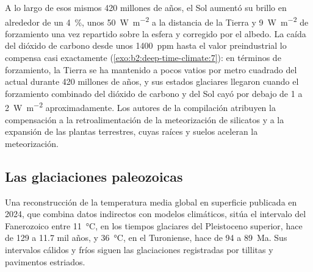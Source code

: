 \begin{omfigure}
\par{}
\end{omfigure}

A lo largo de esos mismos 420 millones de años, el Sol aumentó su brillo en alrededor de un \qty{4}{\percent}, unos
\qty{50}{W.m^{-2}} a la distancia de la Tierra y \qty{9}{W.m^{-2}} de forzamiento una vez repartido sobre la
esfera y corregido por el albedo. La caída del dióxido de carbono desde unos \qty{1400}{ppm} hasta el
valor preindustrial lo compensa casi exactamente (\cref{exo:b2:deep-time-climate:7}): en términos de
forzamiento, la Tierra se ha mantenido a pocos vatios por metro cuadrado del actual durante 420 millones de años,
y sus estados glaciares llegaron cuando el forzamiento combinado del dióxido de carbono y del Sol cayó por debajo de 1
a \qty{2}{W.m^{-2}} aproximadamente. Los autores de la compilación atribuyen la compensación a la retroalimentación de la
meteorización de silicatos y a la expansión de las plantas terrestres, cuyas raíces y suelos aceleran la meteorización.

\subsection*{Las glaciaciones paleozoicas}

Una reconstrucción de la temperatura media global en superficie publicada en 2024, que combina datos indirectos
con modelos climáticos, sitúa el intervalo del Fanerozoico entre \qty{11}{\celsius}, en los tiempos glaciares del
Pleistoceno superior, hace de 129 a 11.7 mil años, y \qty{36}{\celsius}, en el Turoniense, hace de 94 a \qty{89}{Ma}.
Sus intervalos cálidos y fríos siguen las glaciaciones registradas por tillitas y pavimentos estriados.

